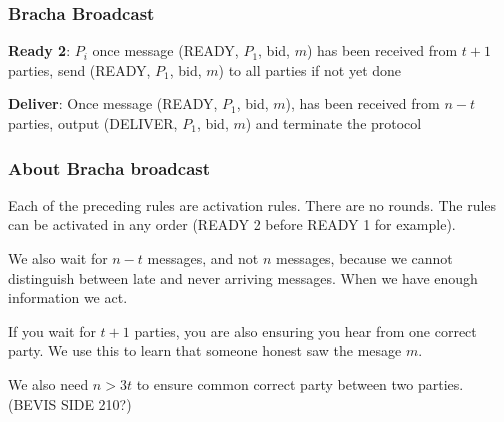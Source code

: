     \begin{frame}
        \frametitle{Bracha Broadcast}
            \textbf{Ready 2}: $P_i$ once message (READY, $P_1$, bid, $m$) has been received from $t+1$ parties, send (READY, $P_1$, bid, $m$) to all parties if not yet done


            \textbf{Deliver}: Once message (READY, $P_1$, bid, $m$), has been received from $n-t$ parties, output (DELIVER, $P_1$, bid, $m$) and terminate the protocol
    \end{frame}

    \begin{frame}
        \frametitle{About Bracha broadcast}
            Each of the preceding rules are activation rules. There are no rounds. The rules can be activated in any order (READY 2 before READY 1 for example). 
            
            We also wait for $n-t$ messages, and not $n$ messages, because we cannot distinguish between late and never arriving messages. When we have enough information we act. 

            If you wait for $t+1$ parties, you are also ensuring you hear from one correct party. We use this to learn that someone honest saw the  mesage $m$. 

            We also need $n > 3t$ to ensure common correct party between two parties. (BEVIS SIDE 210?)
    \end{frame}




